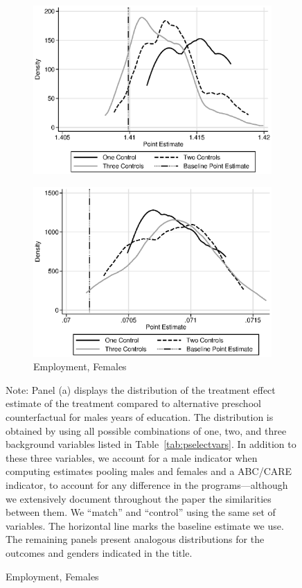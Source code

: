 \begin{figure}
\begin{subfigure}[h]{0.4\textwidth}
		\includegraphics[width=\textwidth]{output/sencontrols_female_years_30y_epan_ipw_P1.eps}
\end{subfigure}%
\begin{subfigure}[h]{0.4\textwidth}
	\centering
	\caption{Employment, Females}
		\includegraphics[width=\textwidth]{output/sencontrols_female_si30y_works_epan_ipw_P1.eps}
\end{subfigure}
\footnotesize \justify
Note: Panel (a) displays the distribution of the treatment effect estimate of the treatment compared to alternative preschool counterfactual for males years of education. The distribution is obtained by using all possible combinations of one, two, and three background variables listed in Table~\ref{tab:pselectvars}. In addition to these three variables, we account for a male indicator when computing estimates pooling males and females and a ABC/CARE indicator, to account for any difference in the programs---although we extensively document throughout the paper the similarities between them. We ``match'' and ``control'' using the same set of variables. The horizontal line marks the baseline estimate we use. The remaining panels present analogous distributions for the outcomes and genders indicated in the title.\\
\end{figure}



